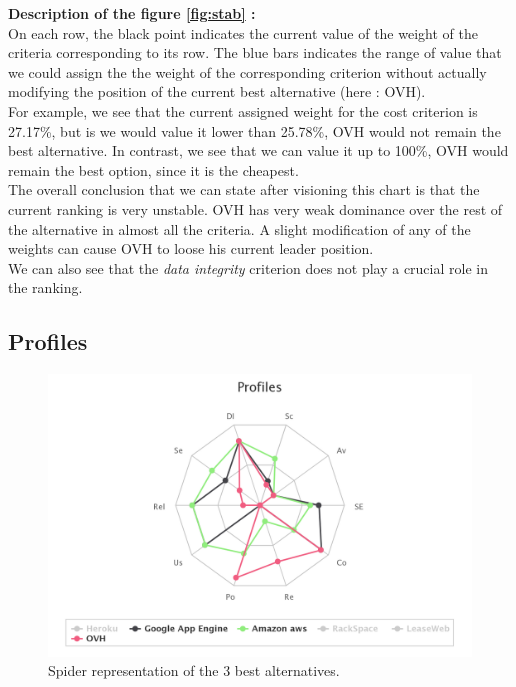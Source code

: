 \documentclass[a4paper,11pt]{article}
\begin{document}
\textbf{Description of the figure \ref{fig:stab} :}\\

On each row, the black point indicates the current value of the weight of the criteria corresponding to its row. The blue bars indicates the range of value that we could assign the the weight of the corresponding criterion without actually modifying the position of the current best alternative (here : OVH). \\

For example, we see that the current assigned weight for the cost criterion is 27.17\%, but is we would value it lower than 25.78\%, OVH would not remain the best alternative. In contrast, we see that we can value it up to 100\%, OVH would remain the best option, since it is the cheapest. \\

The overall conclusion that we can state after visioning this chart is that the current ranking is very unstable. OVH has very weak dominance over the rest of the alternative in almost all the criteria. A slight modification of any of the weights can cause OVH to loose his current leader position.\\

We can also see that the \textit{data integrity} criterion does not play a crucial role in the ranking.

\subsection{Profiles}

\begin{figure}
\centering
  \includegraphics[width=\textwidth]{img/Result/spider_web-3best.png}
\caption{\og Spider \fg{} representation of the 3 best alternatives.}
  \label{fig:spider}
\end{figure}
\end{document}
